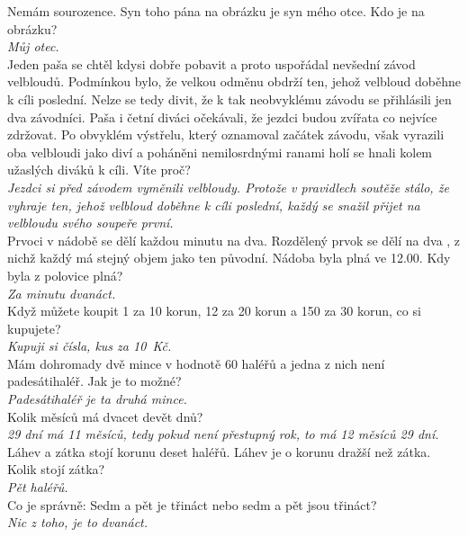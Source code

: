 \begin{multicols}{\value{columnsgames}}
\noindent
Nemám sourozence. Syn toho pána na obrázku je syn mého otce.
Kdo je na obrázku?\\[1 mm]
{\sl Můj otec.}\\

\noindent
Jeden paša se chtěl kdysi dobře pobavit a proto uspořádal 
nevšední závod velbloudů. Podmínkou bylo, že velkou odměnu obdrží 
ten, jehož velbloud doběhne k cíli poslední. Nelze se tedy divit, 
že k tak neobvyklému závodu se přihlásili jen dva závodníci. 
Paša i četní diváci očekávali, že jezdci budou zvířata co nejvíce 
zdržovat. Po obvyklém výstřelu, který oznamoval začátek závodu, však
vyrazili oba velbloudi jako diví a poháněni nemilosrdnými ranami holí 
se hnali kolem užaslých diváků k cíli. Víte proč?\\[1 mm]
{\sl Jezdci si před závodem vyměnili velbloudy. Protože v pravidlech
soutěže stálo, že vyhraje ten, jehož velbloud doběhne k cíli
poslední, každý se snažil přijet na velbloudu svého soupeře první.}\\

\noindent
Prvoci v nádobě se dělí každou minutu na dva. Rozdělený
prvok se dělí na dva , z nichž každý má stejný objem jako ten
původní. Nádoba byla plná ve 12.00. Kdy byla z polovice plná?\\[1 mm]
{\sl Za minutu dvanáct.}\\

\noindent
Když můžete koupit 1 za 10 korun, 12 za 20 korun a 150 za
30 korun, co si kupujete?\\[1 mm]
{\sl Kupuji si čísla, kus za 10~Kč.}\\

\noindent
Mám dohromady dvě mince v hodnotě 60 haléřů a jedna z nich 
není padesátihaléř. Jak je to možné?\\[1 mm]
{\sl Padesátihaléř je ta druhá mince.}\\

\noindent
Kolik měsíců má dvacet devět dnů?\\[1 mm]
{\sl 29 dní má 11 měsíců, tedy pokud není přestupný rok, to má
12 měsíců 29 dní.}\\

\noindent
Láhev a zátka stojí korunu deset haléřů. Láhev je o korunu 
dražší než zátka. Kolik stojí zátka?\\[1 mm]
{\sl Pět haléřů.}\\

\noindent
Co je správně: Sedm a pět je třináct nebo sedm a pět jsou 
třináct?\\[1 mm]
{\sl Nic z toho, je to dvanáct.}\\


\end{multicols}
